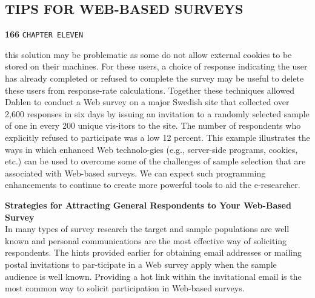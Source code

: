 \documentclass[a4,9pt]{beamer}
\begin{document}
\begin{frame}
\section*{TIPS FOR WEB-BASED SURVEYS}
\begin{flushleft}
\textbf{166}\hspace*{1cm} \texttt{CHAPTER ELEVEN}
\end{flushleft}

\vspace*{1cm}
this solution may be problematic as some do not allow external cookies to be stored on their machines. For these users, a choice of response indicating the user has already completed or refused to complete the survey may be useful to delete these users from response-rate calculations. Together these techniques allowed Dahlen to conduct a Web survey on a major Swedish site that collected over 2,600 responses in six days by issuing an invitation to a randomly selected sample of one in every 200 unique vis-itors to the site. The number of respondents who explicitly refused to participate was a low 12 percent. This example illustrates the ways in which enhanced Web technolo-gies (e.g., server-side programs, cookies, etc.) can be used to overcome some of the challenges of sample selection that are associated with Web-based surveys. We can expect such programming enhancements to continue to create more powerful tools to aid the e-researcher.\\

\vspace*{0.5cm}
\end{frame}

\begin{frame}
\textbf{Strategies for Attracting General Respondents to Your Web-Based Survey}\\

\vspace*{0.2cm}
In many types of survey research the target and sample populations are well known and personal communications are the most effective way of soliciting respondents. The hints provided earlier for obtaining email addresses or mailing postal invitations to par-ticipate in a Web survey apply when the sample audience is well known. Providing a hot link within the invitational email is the most common way to solicit participation in Web-based surveys.\\
\end{frame}
\end{document}
